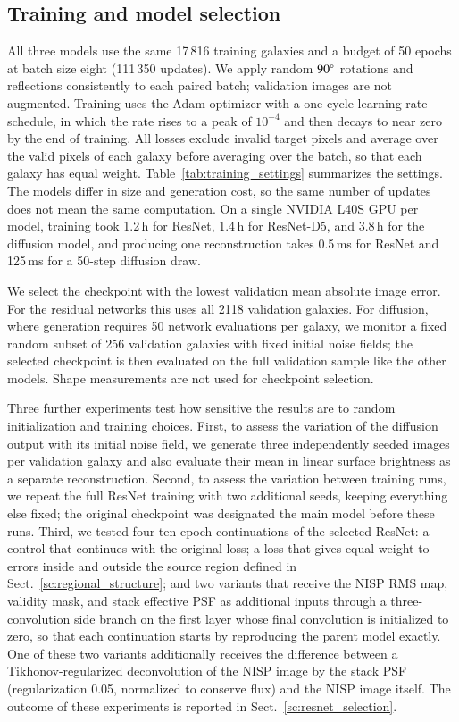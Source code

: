 \documentclass[longauth]{aa}
\begin{document}
\subsection{Training and model selection}
\label{sc:training}

All three models use the same 17\,816 training galaxies and a budget of 50 epochs at batch size eight (111\,350 updates).
We apply random $90^\circ$ rotations and reflections consistently to each paired batch; validation images are not augmented.
Training uses the Adam optimizer with a one-cycle learning-rate schedule, in which the rate rises to a peak of $10^{-4}$ and then decays to near zero by the end of training.
All losses exclude invalid target pixels and average over the valid pixels of each galaxy before averaging over the batch, so that each galaxy has equal weight.
Table~\ref{tab:training_settings} summarizes the settings.
The models differ in size and generation cost, so the same number of updates does not mean the same computation.
On a single NVIDIA L40S GPU per model, training took 1.2\,h for ResNet, 1.4\,h for ResNet-D5, and 3.8\,h for the diffusion model, and producing one reconstruction takes 0.5\,ms for ResNet and 125\,ms for a 50-step diffusion draw.

We select the checkpoint with the lowest validation mean absolute image error.
For the residual networks this uses all 2118 validation galaxies.
For diffusion, where generation requires 50 network evaluations per galaxy, we monitor a fixed random subset of 256 validation galaxies with fixed initial noise fields; the selected checkpoint is then evaluated on the full validation sample like the other models.
Shape measurements are not used for checkpoint selection.

Three further experiments test how sensitive the results are to random initialization and training choices.
First, to assess the variation of the diffusion output with its initial noise field, we generate three independently seeded images per validation galaxy and also evaluate their mean in linear surface brightness as a separate reconstruction.
Second, to assess the variation between training runs, we repeat the full ResNet training with two additional seeds, keeping everything else fixed; the original checkpoint was designated the main model before these runs.
Third, we tested four ten-epoch continuations of the selected ResNet: a control that continues with the original loss; a loss that gives equal weight to errors inside and outside the source region defined in Sect.~\ref{sc:regional_structure}; and two variants that receive the NISP RMS map, validity mask, and stack effective PSF as additional inputs through a three-convolution side branch on the first layer whose final convolution is initialized to zero, so that each continuation starts by reproducing the parent model exactly.
One of these two variants additionally receives the difference between a Tikhonov-regularized deconvolution of the NISP image by the stack PSF (regularization 0.05, normalized to conserve flux) and the NISP image itself.
The outcome of these experiments is reported in Sect.~\ref{sc:resnet_selection}.
\end{document}

